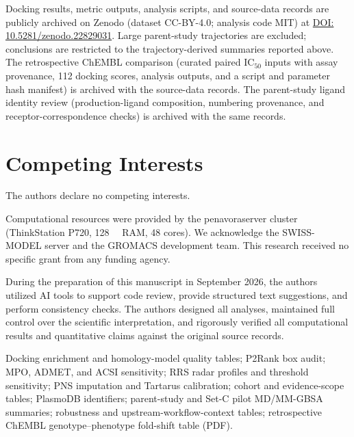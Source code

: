 \documentclass[journal=jcisd8,manuscript=article,layout=traditional]{achemso}
\begin{document}
Docking results, metric outputs, analysis scripts, and source-data records are publicly archived on Zenodo (dataset CC-BY-4.0; analysis code MIT) at \href{https://doi.org/10.5281/zenodo.22829031}{DOI: 10.5281/zenodo.22829031}. Large parent-study trajectories are excluded; conclusions are restricted to the trajectory-derived summaries reported above. The retrospective ChEMBL comparison (curated paired IC$_{50}$ inputs with assay provenance, \num{112} docking scores, analysis outputs, and a script and parameter hash manifest) is archived with the source-data records. The parent-study ligand identity review (production-ligand composition, numbering provenance, and receptor-correspondence checks) is archived with the same records.


\section*{Competing Interests}

The authors declare no competing interests.

\begin{acknowledgement}
Computational resources were provided by the penavoraserver cluster (ThinkStation P720, \qty{128}{\giga\byte} RAM, \num{48} cores). We acknowledge the SWISS-MODEL server and the GROMACS development team. This research received no specific grant from any funding agency.

During the preparation of this manuscript in September 2026, the authors utilized AI tools to support code review, provide structured text suggestions, and perform consistency checks. The authors designed all analyses, maintained full control over the scientific interpretation, and rigorously verified all computational results and quantitative claims against the original source records.
\end{acknowledgement}


\begin{suppinfo}
Docking enrichment and homology-model quality tables; P2Rank box audit; MPO, ADMET, and ACSI sensitivity; RRS radar profiles and threshold sensitivity; PNS imputation and Tartarus calibration; cohort and evidence-scope tables; PlasmoDB identifiers; parent-study and Set-C pilot MD/MM-GBSA summaries; robustness and upstream-workflow-context tables; retrospective ChEMBL genotype--phenotype fold-shift table (PDF).
\end{suppinfo}



\end{document}
